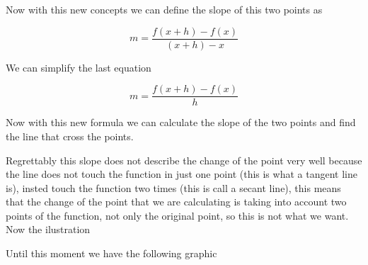 \documentclass[12pt,journal]{IEEEtran}
\begin{document}
    Now with this new concepts we can define the slope of this two points as

    \begin{equation}
        m = \frac{f(x+h) - f(x)}{(x+h) - x}
    \end{equation}

    We can simplify the last equation

    \begin{equation}
        m = \frac{f(x+h) - f(x)}{h}
    \end{equation}

    Now with this new formula we can calculate the slope of the two points and
    find the line that cross the points.

    Regrettably this slope does not describe the change of the point very well
    because the line does not touch the function in just one point (this is
    what a tangent line is), insted touch the function two times (this is call a
    secant line), this means that the change of the point that we are
    calculating is taking into account two points of the function, not only the
    original point, so this is not what we want. Now the ilustration \\


    Until this moment we have the following graphic \\
\end{document}
